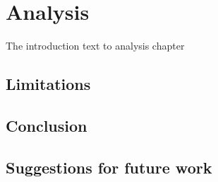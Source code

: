 \chapter{Analysis}
\label{sec:analysis}

The introduction text to analysis chapter

\section{Limitations}
\label{sec:analysis:limitations}

\section{Conclusion}
\label{sec:analysis:conclusion}

\section{Suggestions for future work}
\label{sec:analysis:future}

